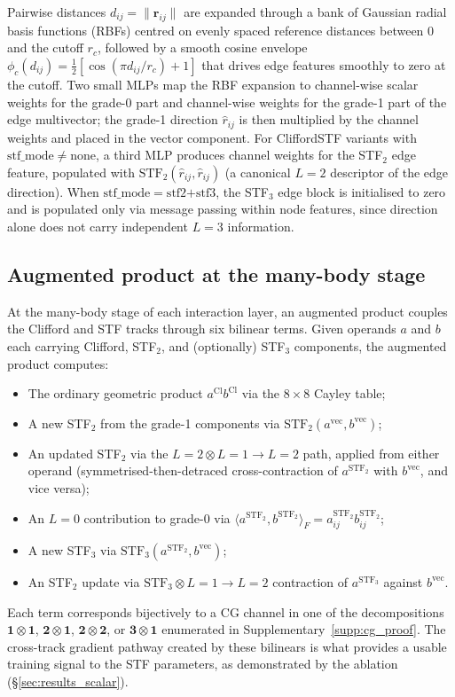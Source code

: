 Pairwise distances $d_{ij} = \lVert\mathbf{r}_{ij}\rVert$ are expanded through a bank of Gaussian radial basis functions (RBFs) centred on evenly spaced reference distances between 0 and the cutoff $r_c$, followed by a smooth cosine envelope $\phi_c(d_{ij}) = \tfrac{1}{2}[\cos(\pi d_{ij}/r_c) + 1]$ that drives edge features smoothly to zero at the cutoff. Two small MLPs map the RBF expansion to channel-wise scalar weights for the grade-0 part and channel-wise weights for the grade-1 part of the edge multivector; the grade-1 direction $\hat{r}_{ij}$ is then multiplied by the channel weights and placed in the vector component. For CliffordSTF variants with $\mathrm{stf\_mode} \neq \text{none}$, a third MLP produces channel weights for the STF$_2$ edge feature, populated with $\mathrm{STF}_2(\hat{r}_{ij}, \hat{r}_{ij})$ (a canonical $L{=}2$ descriptor of the edge direction). When $\mathrm{stf\_mode}=\text{stf2+stf3}$, the STF$_3$ edge block is initialised to zero and is populated only via message passing within node features, since direction alone does not carry independent $L{=}3$ information.

\subsection{Augmented product at the many-body stage}\label{supp:aug_prod}

At the many-body stage of each interaction layer, an augmented product couples the Clifford and STF tracks through six bilinear terms. Given operands $a$ and $b$ each carrying Clifford, STF$_2$, and (optionally) STF$_3$ components, the augmented product computes:
\begin{itemize}
    \item The ordinary geometric product $a^{\mathrm{Cl}} b^{\mathrm{Cl}}$ via the $8\times8$ Cayley table;
    \item A new STF$_2$ from the grade-1 components via $\mathrm{STF}_2(a^{\mathrm{vec}}, b^{\mathrm{vec}})$;
    \item An updated STF$_2$ via the $L{=}2 \otimes L{=}1 \to L{=}2$ path, applied from either operand (symmetrised-then-detraced cross-contraction of $a^{\mathrm{STF}_2}$ with $b^{\mathrm{vec}}$, and vice versa);
    \item An $L{=}0$ contribution to grade-0 via $\langle a^{\mathrm{STF}_2}, b^{\mathrm{STF}_2}\rangle_F = a_{ij}^{\mathrm{STF}_2} b_{ij}^{\mathrm{STF}_2}$;
    \item A new STF$_3$ via $\mathrm{STF}_3(a^{\mathrm{STF}_2}, b^{\mathrm{vec}})$;
    \item An STF$_2$ update via $\mathrm{STF}_3 \otimes L{=}1 \to L{=}2$ contraction of $a^{\mathrm{STF}_3}$ against $b^{\mathrm{vec}}$.
\end{itemize}
Each term corresponds bijectively to a CG channel in one of the decompositions $\mathbf{1}\otimes\mathbf{1}$, $\mathbf{2}\otimes\mathbf{1}$, $\mathbf{2}\otimes\mathbf{2}$, or $\mathbf{3}\otimes\mathbf{1}$ enumerated in Supplementary~\ref{supp:cg_proof}. The cross-track gradient pathway created by these bilinears is what provides a usable training signal to the STF parameters, as demonstrated by the ablation (\S\ref{sec:results_scalar}).


